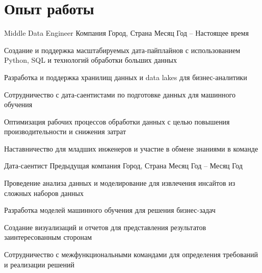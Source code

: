 \section{Опыт работы}

\begin{cventries}
  \cventry
    {Middle Data Engineer} %
    {Компания} %
    {Город, Страна} %
    {Месяц Год -- Настоящее время} %
    {
      \begin{cvitems} %
        \item {Создание и поддержка масштабируемых дата-пайплайнов с использованием Python, SQL и технологий обработки больших данных}
        \item {Разработка и поддержка хранилищ данных и data lakes для бизнес-аналитики}
        \item {Сотрудничество с дата-саентистами по подготовке данных для машинного обучения}
        \item {Оптимизация рабочих процессов обработки данных с целью повышения производительности и снижения затрат}
        \item {Наставничество для младших инженеров и участие в обмене знаниями в команде}
      \end{cvitems}
    }

  \cventry
    {Дата-саентист} %
    {Предыдущая компания} %
    {Город, Страна} %
    {Месяц Год -- Месяц Год} %
    {
      \begin{cvitems} %
        \item {Проведение анализа данных и моделирование для извлечения инсайтов из сложных наборов данных}
        \item {Разработка моделей машинного обучения для решения бизнес-задач}
        \item {Создание визуализаций и отчетов для представления результатов заинтересованным сторонам}
        \item {Сотрудничество с межфункциональными командами для определения требований и реализации решений}
      \end{cvitems}
    }
\end{cventries}
